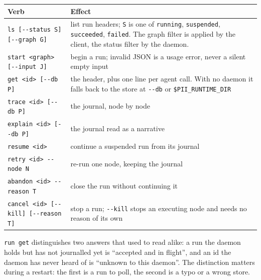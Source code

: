 \begin{center}
\begin{tabular}{@{}>{\raggedright\arraybackslash}p{}>{\raggedright\arraybackslash}p{}@{}}
  \toprule
  \textbf{Verb} & \textbf{Effect} \\
  \midrule
  \texttt{ls [-{}-status S] [-{}-graph G]} & list run headers; \texttt{S} is one of
    \texttt{running}, \texttt{suspended}, \texttt{succeeded}, \texttt{failed}. The graph
    filter is applied by the client, the status filter by the daemon. \\
  \texttt{start <graph> [-{}-input J]} & begin a run; invalid JSON is a usage error, never a
    silent empty input \\
  \texttt{get <id> [-{}-db P]} & the header, plus one line per agent call. With no daemon it
    falls back to the store at \texttt{-{}-db} or \texttt{\$PII\_RUNTIME\_DIR} \\
  \texttt{trace <id> [-{}-db P]} & the journal, node by node \\
  \texttt{explain <id> [-{}-db P]} & the journal read as a narrative \\
  \texttt{resume <id>} & continue a suspended run from its journal \\
  \texttt{retry <id> -{}-node N} & re-run one node, keeping the journal \\
  \texttt{abandon <id> -{}-reason T} & close the run without continuing it \\
  \texttt{cancel <id> [-{}-kill] [-{}-reason T]} & stop a run; \texttt{-{}-kill} stops an
    executing node and needs no reason of its own \\
  \bottomrule
\end{tabular}
\end{center}

\texttt{run get} distinguishes two answers that used to read alike: a run the daemon holds but
has not journalled yet is \enquote{accepted and in flight}, and an id the daemon has never
heard of is \enquote{unknown to this daemon}. The distinction matters during a restart: the
first is a run to poll, the second is a typo or a wrong store.

